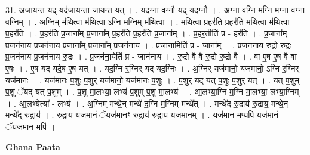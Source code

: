\documentclass[17pt]{extarticle}
\begin{document}
31. अ॒जा॒य॒न्त॒ यद् यद॑जायन्ता जायन्त॒ यत् । . यद॒ग्ना व॒ग्नौ यद् यद॒ग्नौ । . अ॒ग्ना व॒ग्नि म॒ग्नि म॒ग्ना व॒ग्ना व॒ग्निम् । . अ॒ग्निम् म॑थि॒त्वा म॑थि॒त्वा ऽग्नि म॒ग्निम् म॑थि॒त्वा । . म॒थि॒त्वा प्र॒हर॑ति प्र॒हर॑ति मथि॒त्वा म॑थि॒त्वा प्र॒हर॑ति । . प्र॒हर॑ति प्र॒जाना᳚म् प्र॒जाना᳚म् प्र॒हर॑ति प्र॒हर॑ति प्र॒जाना᳚म् । . प्र॒हर॒तीति॑ प्र - हर॑ति । . प्र॒जाना᳚म् प्र॒जन॑नाय प्र॒जन॑नाय प्र॒जाना᳚म् प्र॒जाना᳚म् प्र॒जन॑नाय । . प्र॒जाना॒मिति॑ प्र - जाना᳚म् । . प्र॒जन॑नाय रु॒द्रो रु॒द्रः प्र॒जन॑नाय प्र॒जन॑नाय रु॒द्रः । . प्र॒जन॑ना॒येति॑ प्र - जान॑नाय । . रु॒द्रो वै वै रु॒द्रो रु॒द्रो वै । . वा ए॒ष ए॒ष वै वा ए॒षः । . ए॒ष यद् यदे॒ष ए॒ष यत् । . यद॒ग्नि र॒ग्निर् यद् यद॒ग्निः । . अ॒ग्निर् यज॑मानो॒ यज॑मानो॒ ऽग्नि र॒ग्निर् यज॑मानः । . यज॑मानः प॒शुः प॒शुर् यज॑मानो॒ यज॑मानः प॒शुः । . प॒शुर् यद् यत् प॒शुः प॒शुर् यत् । . यत् प॒शुम् प॒शुं ॅयद् यत् प॒शुम् । . प॒शु मा॒लभ्या॒ लभ्य॑ प॒शुम् प॒शु मा॒लभ्य॑ । . आ॒लभ्या॒ग्नि म॒ग्नि मा॒लभ्या॒ लभ्या॒ग्निम् । . आ॒लभ्येत्या᳚ - लभ्य॑ । . अ॒ग्निम् मन्थे॒न् मन्थे॑ द॒ग्नि म॒ग्निम् मन्थे᳚त् । . मन्थे᳚द् रु॒द्राय॑ रु॒द्राय॒ मन्थे॒न् मन्थे᳚द् रु॒द्राय॑ । . रु॒द्राय॒ यज॑मानं॒ ॅयज॑मानꣳ रु॒द्राय॑ रु॒द्राय॒ यज॑मानम् । . यज॑मान॒ मप्यपि॒ यज॑मानं॒ ॅयज॑मान॒ मपि॑ । \newline

\textbf{Ghana Paata } \newline
\end{document}
